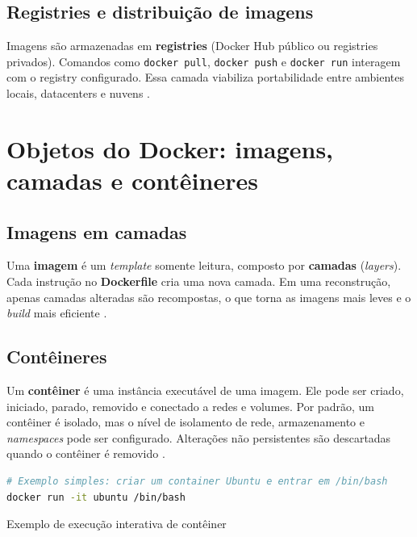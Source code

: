 \subsection{Registries e distribuição de imagens}
\label{subsec:docker-registries}

Imagens são armazenadas em \textbf{registries} (Docker Hub público ou registries privados). Comandos como \texttt{docker pull}, \texttt{docker push} e \texttt{docker run} interagem com o registry configurado. Essa camada viabiliza portabilidade entre ambientes locais, datacenters e nuvens \cite{docker_overview}. 

\section{Objetos do Docker: imagens, camadas e contêineres}
\label{sec:docker-objetos}

\subsection{Imagens em camadas}
\label{subsec:docker-imagens}

Uma \textbf{imagem} é um \textit{template} somente leitura, composto por \textbf{camadas} (\textit{layers}). Cada instrução no \textbf{Dockerfile} cria uma nova camada. Em uma reconstrução, apenas camadas alteradas são recompostas, o que torna as imagens mais leves e o \textit{build} mais eficiente \cite{docker_overview}. 

\subsection{Contêineres}
\label{subsec:docker-containers}

Um \textbf{contêiner} é uma instância executável de uma imagem. Ele pode ser criado, iniciado, parado, removido e conectado a redes e volumes. Por padrão, um contêiner é isolado, mas o nível de isolamento de rede, armazenamento e \textit{namespaces} pode ser configurado. Alterações não persistentes são descartadas quando o contêiner é removido \cite{docker_overview}. 

\begin{codigo}[H]
\begin{lstlisting}[language=bash]
# Exemplo simples: criar um container Ubuntu e entrar em /bin/bash
docker run -it ubuntu /bin/bash
\end{lstlisting}
\caption{Exemplo de execução interativa de contêiner}
\label{lst:docker-run}
\end{codigo}

